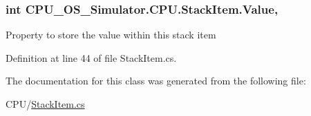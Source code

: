\subsubsection[{Value}]{\setlength{\rightskip}{0pt plus 5cm}int C\+P\+U\+\_\+\+O\+S\+\_\+\+Simulator.\+C\+P\+U.\+Stack\+Item.\+Value\hspace{0.3cm}{\ttfamily [get]}, {\ttfamily [set]}}\label{class_c_p_u___o_s___simulator_1_1_c_p_u_1_1_stack_item_ac8e518e9111640d56d59efbff2fa3161}


Property to store the value within this stack item 



Definition at line 44 of file Stack\+Item.\+cs.



The documentation for this class was generated from the following file\+:\begin{DoxyCompactItemize}
\item 
C\+P\+U/\hyperlink{_stack_item_8cs}{Stack\+Item.\+cs}\end{DoxyCompactItemize}
